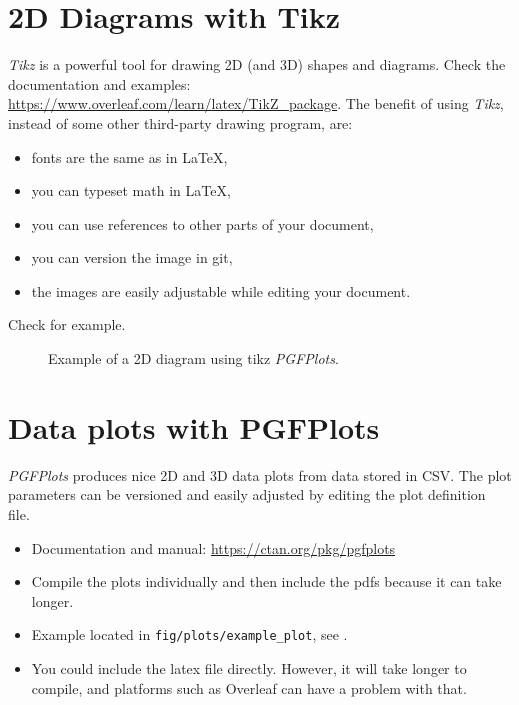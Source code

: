 \section{2D Diagrams with Tikz}

\emph{Tikz} is a powerful tool for drawing 2D (and 3D) shapes and diagrams.
Check the documentation and examples: \url{https://www.overleaf.com/learn/latex/TikZ_package}.
The benefit of using \emph{Tikz}, instead of some other third-party drawing program, are:
\begin{itemize}
  \item fonts are the same as in LaTeX,
  \item you can typeset math in LaTeX,
  \item you can use references to other parts of your document,
  \item you can version the image in git,
  \item the images are easily adjustable while editing your document.
\end{itemize}
Check  for example.

\begin{figure}[!h]
  \centering

  \begin{adjustbox}{max totalsize={0.8\textwidth}{0.90\textheight}, center}
    
  \end{adjustbox}

  \caption{Example of a 2D diagram using tikz \emph{PGFPlots}.}
  \label{fig:pgfplots}
\end{figure}

\section{Data plots with PGFPlots}

\emph{PGFPlots} produces nice 2D and 3D data plots from data stored in CSV.
The plot parameters can be versioned and easily adjusted by editing the plot definition file.
\begin{itemize}
  \item Documentation and manual: \url{https://ctan.org/pkg/pgfplots}
  \item Compile the plots individually and then include the pdfs because it can take longer.
  \item Example located in \texttt{fig/plots/example\_plot}, see .
  \item You could include the latex file directly. However, it will take longer to compile, and platforms such as Overleaf can have a problem with that.
\end{itemize}

